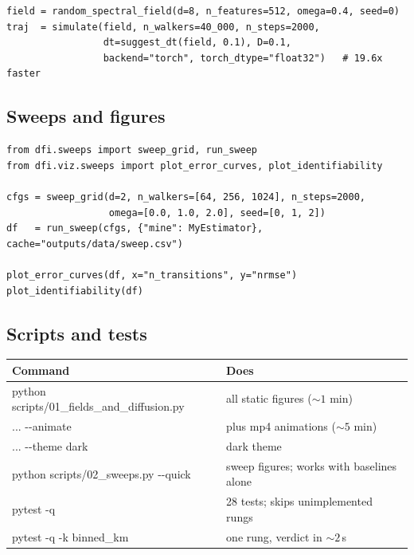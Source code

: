 \documentclass[11pt,a4paper]{article}
\newcommand{\bt}[1]{{\ttfamily\footnotesize #1}}
\begin{document}
\begin{codebox}
\begin{lstlisting}
field = random_spectral_field(d=8, n_features=512, omega=0.4, seed=0)
traj  = simulate(field, n_walkers=40_000, n_steps=2000,
                 dt=suggest_dt(field, 0.1), D=0.1,
                 backend="torch", torch_dtype="float32")   # 19.6x faster
\end{lstlisting}
\end{codebox}

\subsection*{Sweeps and figures}

\begin{codebox}
\begin{lstlisting}
from dfi.sweeps import sweep_grid, run_sweep
from dfi.viz.sweeps import plot_error_curves, plot_identifiability

cfgs = sweep_grid(d=2, n_walkers=[64, 256, 1024], n_steps=2000,
                  omega=[0.0, 1.0, 2.0], seed=[0, 1, 2])
df   = run_sweep(cfgs, {"mine": MyEstimator}, cache="outputs/data/sweep.csv")

plot_error_curves(df, x="n_transitions", y="nrmse")
plot_identifiability(df)
\end{lstlisting}
\end{codebox}

\subsection*{Scripts and tests}

\begin{center}
\begin{tabular}{@{}L{0.44\textwidth} L{0.50\textwidth}@{}}
\toprule
\textbf{Command} & \textbf{Does} \\
\midrule
\bt{python scripts/01\_fields\_and\_diffusion.py} & all static figures ($\sim1$ min) \\
\bt{\phantom{python scripts/01} ... {-}{-}animate} & plus mp4 animations ($\sim5$ min) \\
\bt{\phantom{python scripts/01} ... {-}{-}theme dark} & dark theme \\
\bt{python scripts/02\_sweeps.py {-}{-}quick} & sweep figures; works with baselines alone \\
\bt{pytest -q} & 28 tests; skips unimplemented rungs \\
\bt{pytest -q -k binned\_km} & one rung, verdict in $\sim2\,$s \\
\bottomrule
\end{tabular}
\end{center}
\end{document}
